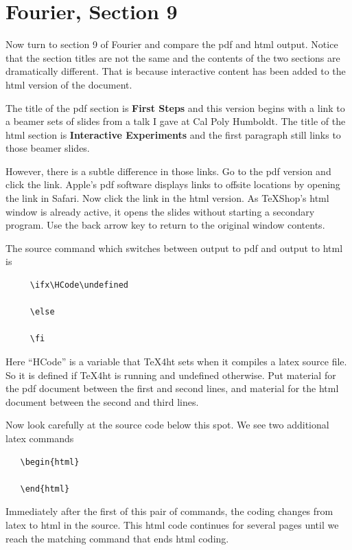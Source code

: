 \documentclass[11pt, oneside]{article}   	%
\begin{document}
\newpage
 
\section{Fourier, Section 9}

Now turn to section 9 of Fourier and compare the pdf and html output. Notice that the section titles
are not the same and the contents of the two sections are dramatically different. That is because 
interactive content has been added to the html version of the document.

The title of the pdf section is {\bf First Steps} and this version begins with a link to a beamer sets of slides from a talk I gave at Cal Poly Humboldt. The title of the html section is {\bf Interactive Experiments} and 
the first paragraph still links to those beamer slides. 

However, there is a subtle difference in those links. Go to the pdf version and click the link. Apple's pdf software displays links to offsite locations by opening the link in Safari. Now click the link in the html version. As TeXShop's html window
is already active,  it opens the slides without starting a secondary program. Use the back arrow key to return to the original window contents.

The source command which switches between output to pdf and output to html is
\begin{verbatim}
     \ifx\HCode\undefined
     
     \else
     
     \fi     
\end{verbatim} 
Here ``HCode'' is a variable that TeX4ht sets when it compiles a latex source file. So it
is defined if TeX4ht is running and undefined otherwise. Put material for the pdf document between
the first and second lines, and material for the html document between the second and third lines.

Now look carefully at the source code below this spot. We see two additional latex commands
\begin{verbatim}
   \begin{html}
   
   \end{html}
\end{verbatim}

Immediately after the first of this pair of commands, the coding changes from latex to html in the source.
This html
code continues for several pages until we reach the matching command that ends html coding.
\end{document}
